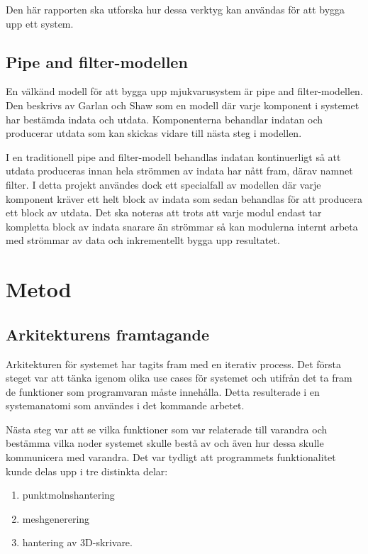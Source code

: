 Den här rapporten ska utforska hur dessa verktyg kan användas för att bygga upp ett system.

\subsection{Pipe and filter-modellen}
En välkänd modell för att bygga upp mjukvarusystem är pipe and filter-modellen. Den beskrivs av Garlan och Shaw \cite{garlan1993introduction} som en modell där varje komponent i systemet har bestämda indata och utdata. Komponenterna behandlar indatan och producerar utdata som kan skickas vidare till nästa steg i modellen.

I en traditionell pipe and filter-modell behandlas indatan kontinuerligt så att utdata produceras innan hela strömmen av indata har nått fram, därav namnet filter. I detta projekt användes dock ett specialfall av modellen där varje komponent kräver ett helt block av indata som sedan behandlas för att producera ett block av utdata. Det ska noteras att trots att varje modul endast tar kompletta block av indata snarare än strömmar så kan modulerna internt arbeta med strömmar av data och inkrementellt bygga upp resultatet.


\section{Metod}
\label{sec:method-lundberg}

\subsection{Arkitekturens framtagande}
Arkitekturen för systemet har tagits fram med en iterativ process. Det första steget var att tänka igenom olika use cases för systemet och utifrån det ta fram de funktioner som programvaran måste innehålla. Detta resulterade i en systemanatomi som användes i det kommande arbetet.

Nästa steg var att se vilka funktioner som var relaterade till varandra och bestämma vilka noder systemet skulle bestå av och även hur dessa skulle kommunicera med varandra. Det var tydligt att programmets funktionalitet kunde delas upp i tre distinkta delar:

\begin{enumerate}
	\item punktmolnshantering
	
	\item meshgenerering
	
	\item hantering av 3D-skrivare.
\end{enumerate}

